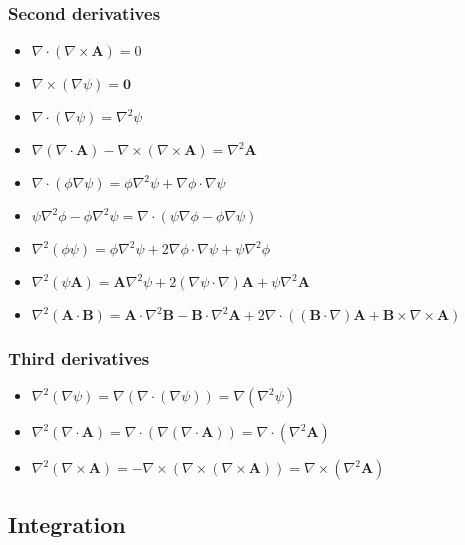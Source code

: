 \subsubsection{Second derivatives}
\begin{itemize}
\item
  $\nabla\cdot(\nabla\times\mathbf{A})=0 $
\item
  $\nabla\times(\nabla\psi)= \mathbf{0} $
\item
  $\nabla\cdot(\nabla\psi)=\nabla^{2}\psi $
\item
  $\nabla\left(\nabla\cdot\mathbf{A}\right)
  -\nabla\times\left(\nabla\times\mathbf{A}\right)=\nabla^{2}\mathbf{A} $
\item
  $\nabla\cdot(\phi\nabla\psi)=\phi\nabla^{2}\psi + \nabla\phi\cdot\nabla\psi $
\item
  $\psi\nabla^2\phi-\phi\nabla^2\psi=
  \nabla\cdot\left(\psi\nabla\phi-\phi\nabla\psi\right)$
\item
  $\nabla^2(\phi\psi)=
  \phi\nabla^2\psi+2\nabla\phi\cdot\nabla\psi+\psi\nabla^2\phi$
\item
  $\nabla^2(\psi\mathbf{A})=
  \mathbf{A}\nabla^2\psi+2(\nabla\psi\cdot\nabla)\mathbf{A}
  +\psi\nabla^2\mathbf{A}$
\item
  $\nabla^2(\mathbf{A}\cdot\mathbf{B})=
  \mathbf{A}\cdot\nabla^2\mathbf{B} - \mathbf{B}\cdot\nabla^2\mathbf{A}
  + 2\nabla\cdot((\mathbf{B}\cdot\nabla)\mathbf{A}
  + \mathbf{B}\times\nabla\times\mathbf{A})$
\end{itemize}

\subsubsection{Third derivatives}
\begin{itemize}
\item
  $\nabla^{2}(\nabla\psi) = \nabla(\nabla\cdot(\nabla\psi))
  = \nabla(\nabla^{2}\psi)$
\item
  $\nabla^{2}(\nabla\cdot\mathbf{A})
  =\nabla\cdot(\nabla(\nabla\cdot\mathbf{A}))=\nabla\cdot(\nabla^{2}\mathbf{A})$
\item
  $\nabla^{2}(\nabla\times\mathbf{A}) =
  -\nabla\times(\nabla\times(\nabla\times\mathbf{A}))
  = \nabla\times(\nabla^{2}\mathbf{A})$
\end{itemize}

\subsection{Integration}
